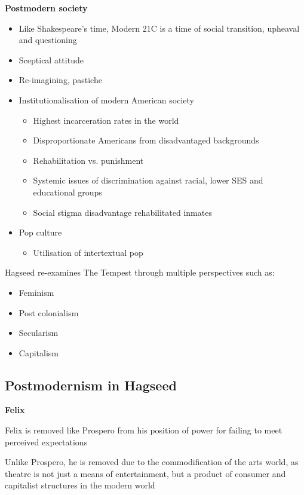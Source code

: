		\textbf{Postmodern society}
		\begin{itemize}
			\item Like Shakespeare's time, Modern 21C is a time of social transition, upheaval and questioning
			\item Sceptical attitude
			\item Re-imagining, pastiche
			\item Institutionalisation of modern American society
			\begin{itemize}
				\item Highest incarceration rates in the world
				\item Disproportionate Americans from disadvantaged backgrounds
				\item Rehabilitation vs. punishment
				\item Systemic issues of discrimination against racial, lower SES and educational groups
				\item Social stigma disadvantage rehabilitated inmates
			\end{itemize}
			\item Pop culture
			\begin{itemize}
				\item Utilisation of intertextual pop
			\end{itemize}
		\end{itemize}

	Hagseed re-examines The Tempest through multiple perspectives such as:
	\begin{itemize}
		\item Feminism
		\item Post colonialism
		\item Secularism
		\item Capitalism
	\end{itemize}

	\subsection{Postmodernism in Hagseed}
	
		\textbf{Felix}

			Felix is removed like Prospero from his position of power for failing to meet perceived expectations

			Unlike Prospero, he is removed due to the commodification of the arts world, as theatre is not just a means of entertainment, but a product of consumer and capitalist structures in the modern world

